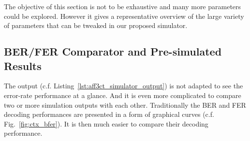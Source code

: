 The objective of this section is not to be exhaustive and many more parameters
could be explored. However it gives a representative overview of the large
variety of parameters that can be tweaked in our proposed simulator.

\subsection{BER/FER Comparator and Pre-simulated Results} %


The \AFFECT output (c.f. Listing~\ref{lst:aff3ct_simulator_output}) is not
adapted to see the error-rate performance at a glance. And it is even more
complicated to compare two or more simulation outputs with each other.
Traditionally the BER and FER decoding performances are presented in a form of
graphical curves (c.f. Fig.~\ref{fig:ctx_bfer}). It is then much easier to
compare their decoding performance.


